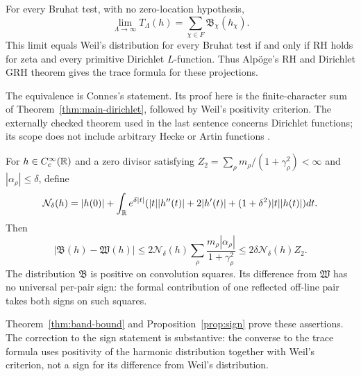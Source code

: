 \begin{corollary}
\label{cor:main-adelic}
For every Bruhat test, with no zero-location hypothesis,
\[
             \lim_{\Lambda\to\infty}T_\Lambda(h)
                      =\sum_{\chi\in F}\mathfrak B_\chi(h_\chi).
\]
This limit equals Weil's distribution for every Bruhat test if
and only if RH holds for zeta and every primitive Dirichlet
$L$-function. Thus Alp\"oge's RH and Dirichlet GRH theorem gives
the trace formula for these projections.
\end{corollary}
The equivalence is Connes's statement. Its proof here is the
finite-character sum of Theorem~\ref{thm:main-dirichlet}, followed
by Weil's positivity criterion. The externally checked theorem
used in the last sentence concerns Dirichlet functions; its scope
does not include arbitrary Hecke or Artin functions
\citep{alpogeverification,mitverification}.

\begin{theorem}
\label{thm:intro-band}
For $h\in C_c^\infty(\mathbb R)$ and a zero divisor satisfying
$Z_2=\sum_\rho m_\rho/(1+\gamma_\rho^2)<\infty$ and
$|\alpha_\rho|\leq\delta$, define
\[
 \mathcal N_\delta(h)=|h(0)|+
 \int_\mathbb R e^{\delta|t|}
 (|t||h''(t)|+2|h'(t)|+(1+\delta^2)|t||h(t)|)dt.
\]
Then
\[
 |\mathfrak B(h)-\mathfrak W(h)|
 \leq2\mathcal N_\delta(h)
       \sum_\rho\frac{m_\rho|\alpha_\rho|}{1+\gamma_\rho^2}
 \leq2\delta\mathcal N_\delta(h)Z_2.
\]
The distribution $\mathfrak B$ is positive on convolution squares.
Its difference from $\mathfrak W$ has no universal per-pair sign:
the formal contribution of one reflected off-line pair takes both
signs on such squares.
\end{theorem}
Theorem~\ref{thm:band-bound} and Proposition~\ref{prop:sign} prove
these assertions. The correction to the sign statement is substantive:
the converse to the trace formula uses positivity of the harmonic
distribution together with Weil's criterion, not a sign for its
difference from Weil's distribution.

